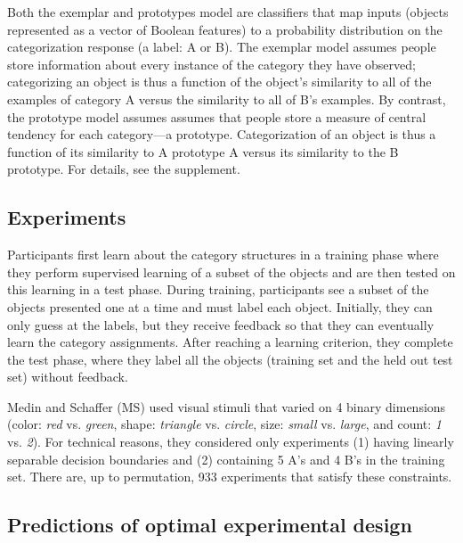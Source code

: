 \documentclass{article}
\begin{document}
Both the exemplar and prototypes model are classifiers that map inputs (objects represented as a vector of Boolean features) to a probability distribution on the categorization response (a label: A or B).
The exemplar model assumes people store information about every instance of the category they have observed; categorizing an object is thus a function of the object's similarity to all of the examples of category A versus the similarity to all of B's examples.
By contrast, the prototype model assumes assumes that people store a measure of central tendency for each category---a prototype.
Categorization of an object is thus a function of its similarity to A prototype  A versus its similarity to the B prototype.
For details, see the supplement.

\subsection{Experiments}

Participants first learn about the category structures in a training phase where they perform supervised learning of a subset of the objects and are then tested on this learning in a test phase.
During training, participants see a subset of the objects presented one at a time and must label each object.
Initially, they can only guess at the labels, but they receive feedback so that they can eventually learn the category assignments.
After reaching a learning criterion, they complete the test phase, where they label all the objects (training set and the held out test set) without feedback.

Medin and Schaffer (MS) used visual stimuli that varied on 4 binary dimensions (color: \emph{red} vs. \emph{green}, shape: \emph{triangle} vs. \emph{circle}, size: \emph{small} vs. \emph{large}, and count: \emph{1} vs. \emph{2}).
For technical reasons, they considered only experiments (1) having linearly separable decision boundaries and (2) containing 5 A's and 4 B's in the training set.
There are, up to permutation, 933 experiments that satisfy these constraints.

\subsection{Predictions of optimal experimental design}
\end{document}
